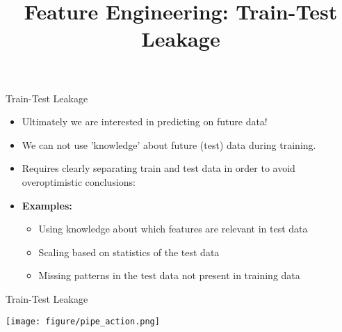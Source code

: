 



\newcommand{\titlefigure}{data_leakage_title.png}
\newcommand{\learninggoals}{
  \item Understand the concept of train-test leakage
  \item Recognize common sources of data leakage
  \item Learn to implement proper preprocessing pipelines
  \item Know how to avoid overly optimistic performance estimates
}

\title{Feature Engineering: Train-Test Leakage}
\date{}





\sloppy



\begin{vbframe}{Train-Test Leakage}

\begin{itemize}
\item Ultimately we are interested in predicting on future data!

\item We can not use 'knowledge' about future (test) data during training.

\item Requires clearly separating train and test data in order to avoid overoptimistic conclusions:

\item \textbf{Examples:}

  \begin{itemize}
  \item Using knowledge about which features are relevant in test data
  
  \item Scaling based on statistics of the test data 
  
  \item Missing patterns in the test data not present in training data
  \end{itemize}
\end{itemize}

\end{vbframe}


\begin{vbframe}{Train-Test Leakage}

\vfill

\begin{center}
\texttt{[image: figure/pipe\_action.png]}
\end{center}

\vfill

\end{vbframe}

\endlecture

